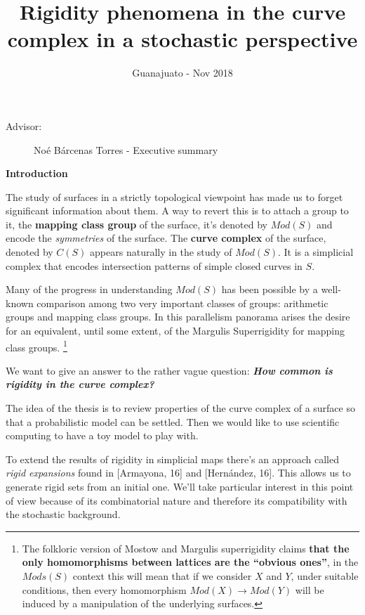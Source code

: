 \documentclass[a4paper]{tufte-handout}
\title{Rigidity phenomena in the curve complex in a stochastic perspective}
\date{Guanajuato - Nov 2018}
\begin{document}
\maketitle


\begin{projects}
	\begin{description}
		\item [Advisor:] Noé Bárcenas Torres - Executive summary
	\end{description}
\end{projects}

{\Large \noindent \textbf{Introduction}}

\justify
The study of surfaces in a strictly topological viewpoint has made us to forget significant information about them. A way to revert this is to attach a group to it, the \textbf{mapping class group} of the surface, it's denoted by $Mod(S)$ and encode the \textit{symmetries} of the surface. The \textbf{curve complex} of the surface, denoted by $C(S)$ appears naturally in the study of $Mod(S)$. It is a simplicial complex that encodes intersection patterns of simple closed curves in $S$. 

Many of the progress in understanding $Mod(S)$ has been possible by a well-known comparison among two very important classes of groups: arithmetic groups and mapping class groups. In this parallelism panorama arises the desire for an equivalent, until some extent, of the Margulis Superrigidity for mapping class groups. \footnote{The folkloric version of Mostow and Margulis superrigidity claims \textbf{that the only homomorphisms between lattices are the “obvious ones”}, in the $Mods(S)$ context this will mean that if we consider $X$ and $Y$, under suitable conditions, then every homomorphism $Mod(X) \to Mod(Y)$ will be induced by a manipulation of the underlying surfaces. }

We want to give an answer to the rather vague question: \textbf{\textit{How \textbf{common} is rigidity in the curve complex?}}

The idea of the thesis is to review properties of the curve complex of a surface so that a probabilistic model can be settled. Then we would like to use scientific computing to have a toy model to play with.

To extend the results of rigidity in simplicial maps there's an approach called \textit{rigid expansions} found  in [Armayona, 16]\cite{rigidExpJA} and [Hernández, 16]\cite{rigidExpJH}. This allows us to generate rigid sets from an initial one. We'll take particular interest in this point of view because of its combinatorial nature and therefore its compatibility with the stochastic background.
\end{document}
